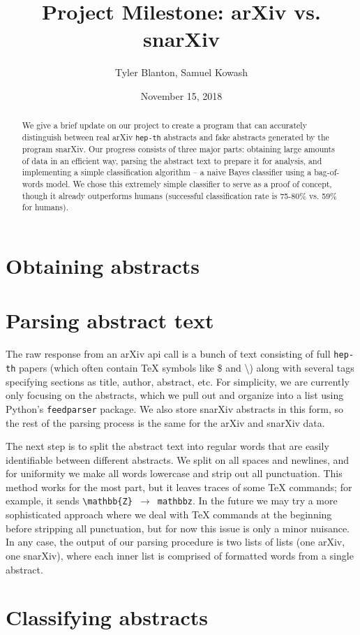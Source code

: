 \documentclass{article}
\title{Project Milestone: arXiv vs. snarXiv}
\author{Tyler Blanton, Samuel Kowash}
\date{November 15, 2018}
\begin{document}
\maketitle

\begin{abstract}
We give a brief update on our project to create a program that can accurately distinguish between real arXiv \texttt{hep-th} abstracts and fake abstracts generated by the program snarXiv.
Our progress consists of three major parts: obtaining large amounts of data in an efficient way, parsing the abstract text to prepare it for analysis, and implementing a simple classification algorithm -- a naive Bayes classifier using a bag-of-words model.
We chose this extremely simple classifier to serve as a proof of concept, though it already outperforms humans (successful classification rate is 75-80\% vs. 59\% for humans).
\end{abstract}

\section{Obtaining abstracts}



\section{Parsing abstract text}
The raw response from an arXiv api call is a bunch of text consisting of full \texttt{hep-th} papers (which often contain TeX symbols like \$ and  \textbackslash) along with several tags specifying sections as title, author, abstract, etc.
For simplicity, we are currently only focusing on the abstracts, which we pull out and organize into a list using Python's \texttt{feedparser} package.
We also store snarXiv abstracts in this form, so the rest of the parsing process is the same for the arXiv and snarXiv data.

The next step is to split the abstract text into regular words that are easily identifiable between different abstracts.
We split on all spaces and newlines, and for uniformity we make all words lowercase and strip out all punctuation.
This method works for the most part, but it leaves traces of some TeX commands; for example, it sends \texttt{\textbackslash mathbb\{Z\} $\to$ mathbbz}.
In the future we may try a more sophisticated approach where we deal with TeX commands at the beginning before stripping all punctuation, but for now this issue is only a minor nuisance.
In any case, the output of our parsing procedure is two lists of lists (one arXiv, one snarXiv), where each inner list is comprised of formatted words from a single abstract.



\section{Classifying abstracts}
\end{document}

